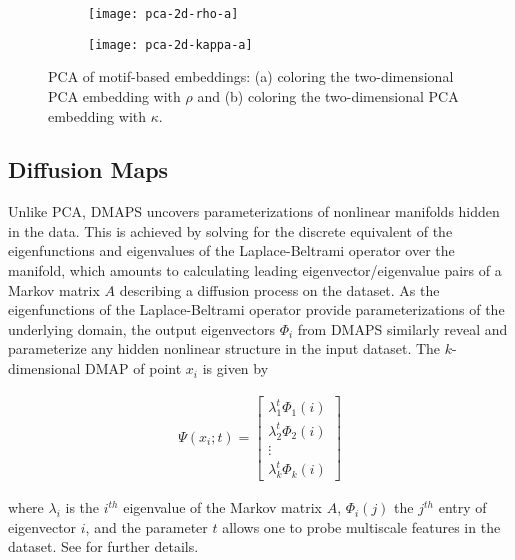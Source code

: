   \begin{figure}
    \vspace{-5mm} \centering
    \begin{subfigure}{0.49\textwidth}
      \centering
      \texttt{[image: pca-2d-rho-a]}
      \subcaption{\label{fig:pca-rho}}
    \end{subfigure} %
    \begin{subfigure}{0.49\textwidth}
      \centering
      \texttt{[image: pca-2d-kappa-a]}
      \subcaption{\label{fig:pca-kappa}}
    \end{subfigure}%
    \caption[Principal component analysis of motif-based
    embeddings]{PCA of motif-based embeddings: (a) coloring the
      two-dimensional PCA embedding with $\rho$ and (b) coloring the
      two-dimensional PCA embedding with $\kappa$. \label{fig:pca}}
  \end{figure}

  \subsection{Diffusion Maps}

  Unlike PCA, DMAPS uncovers parameterizations of nonlinear manifolds
  hidden in the data.
  This is achieved by solving for the discrete equivalent of the
  eigenfunctions and eigenvalues of the Laplace-Beltrami operator over
  the manifold, which amounts to calculating leading
  eigenvector/eigenvalue pairs of a Markov matrix $A$ describing a
  diffusion process on the dataset.
  As the eigenfunctions of the Laplace-Beltrami operator provide
  parameterizations of the underlying domain, the output eigenvectors
  $\Phi_i$ from DMAPS similarly reveal and parameterize any hidden
  nonlinear structure in the input dataset. The $k$-dimensional DMAP
  of point $x_i$ is given by

  \begin{align*}
    \Psi(x_i; t) = \begin{bmatrix} \lambda_1^t \Phi_1(i) \\ \lambda_2^t
      \Phi_2(i) \\ \vdots \\
      \lambda_k^t \Phi_k(i) \end{bmatrix}
  \end{align*}

  \noindent where $\lambda_i$ is the $i^{th}$ eigenvalue of the Markov
  matrix $A$, $\Phi_i(j)$ the $j^{th}$ entry of eigenvector $i$, and
  the parameter $t$ allows one to probe multiscale features in the
  dataset. See \cite{coifman_diffusion_2006,nadler_diffusion_2006} for
  further details.

